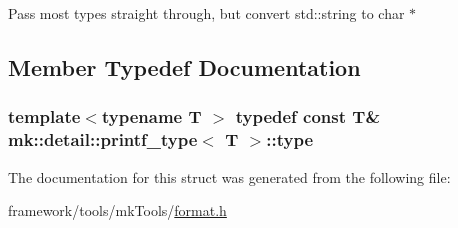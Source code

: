 Pass most types straight through, but convert std\+::string to char $\ast$ 

\subsection{Member Typedef Documentation}
\subsubsection[{\texorpdfstring{type}{type}}]{\setlength{\rightskip}{0pt plus 5cm}template$<$typename T $>$ typedef const T\& {\bf mk\+::detail\+::printf\+\_\+type}$<$ T $>$\+::{\bf type}}\hypertarget{structmk_1_1detail_1_1printf__type_aa318c0f9208836fb7b1af945ec475ae9}{}\label{structmk_1_1detail_1_1printf__type_aa318c0f9208836fb7b1af945ec475ae9}


The documentation for this struct was generated from the following file\+:\begin{DoxyCompactItemize}
\item 
framework/tools/mk\+Tools/\hyperlink{format_8h}{format.\+h}\end{DoxyCompactItemize}

